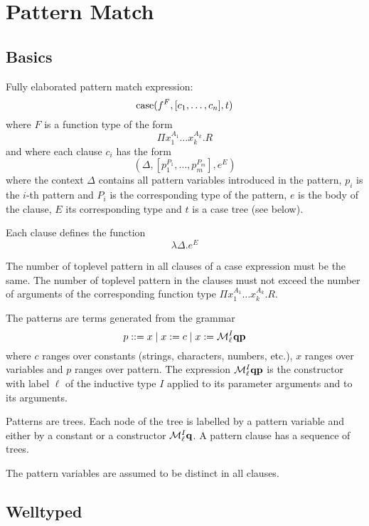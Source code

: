 \section{Pattern Match}

\subsection{Basics}

Fully elaborated pattern match expression:
$$
{\text{case}}( f^F , [c_1,  \ldots, c_n] , t)
$$
%
where $F$ is a function type of the form
%
$$
\Pi x_1^{A_1} \ldots x_k^{A_k}. R
$$
%
and where each clause $c_i$ has the form
%
$$
    (\Delta, [p_1^{P_1}, \ldots, p_m^{P_m}], e^E)
$$
where the context $\Delta$ contains all pattern variables introduced in the
pattern, $p_i$ is the $i$-th pattern
and $P_i$ is the corresponding type of the pattern, $e$ is the body of the
clause, $E$ its corresponding type and $t$ is a case tree (see below).

Each clause defines the function
$$
\lambda \Delta . e^E
$$

The number of toplevel pattern in all clauses of a case expression must be the
same. The number of toplevel pattern in the clauses must not exceed the number
of arguments of the corresponding function type $\Pi x_1^{A_1} \ldots x_k^{A_k}.
R$.


The patterns are terms generated from the grammar
$$
    p ::= x \mid x := c \mid x := {\cal M}^I_\ell {\mathbf q} {\mathbf p}
$$
where $c$ ranges over constants (strings, characters, numbers, etc.), $x$ ranges
over variables and $p$ ranges over pattern. The expression ${\cal M}^I_\ell {\mathbf q}
{\mathbf p}$ is the constructor with label $\ell$ of the inductive type $I$ applied to its
parameter arguments and to its arguments.

Patterns are trees. Each node of the tree is labelled by a pattern variable and
either by a constant or a constructor ${\cal M}^I_\ell {\mathbf q}$. A pattern clause has a
sequence of trees.

The pattern variables are assumed to be distinct in all clauses.



\subsection{Welltyped}

